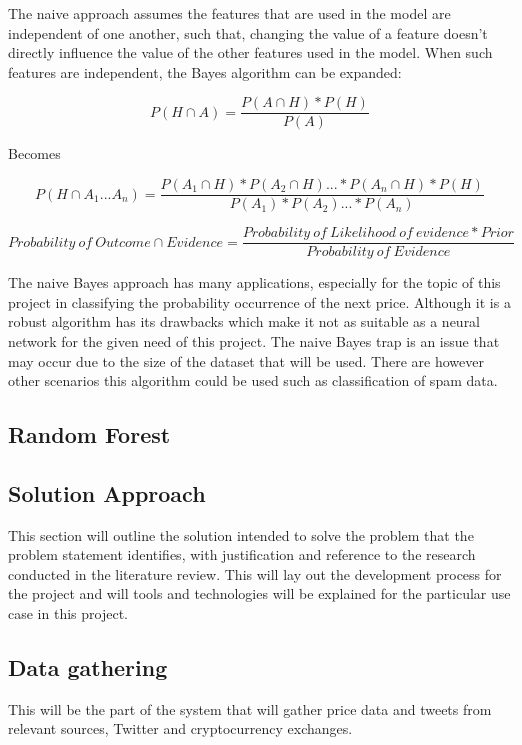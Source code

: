 \documentclass[oneside, 12pt]{article}
\begin{document}
			The naive approach assumes the features that are used in the model are independent of one another, such that, changing the value of a feature doesn't directly influence the value of the other features used in the model. When such features are independent, the Bayes algorithm can be expanded:
			
			\[P(H\cap A) = \frac{P(A\cap H) * P(H)}{P(A)} \]
			
			\begin{center}
				Becomes
			\end{center}
			
			\[P(H\cap A_1 ... A_n) = \frac{P(A_1\cap H) * P(A_2\cap H) ... * P(A_n\cap H) * P(H)}{P(A_1) * P(A_2) ... * P(A_n)} \]
			
			\[Probability \ of \ Outcome \cap Evidence = \frac{Probability \ of \ Likelihood \ of \ evidence * Prior}{Probability \ of \ Evidence} \]
			
			The naive Bayes approach has many applications, especially for the topic of this project in classifying the probability occurrence of the next price. Although it is a robust algorithm has its drawbacks which make it not as suitable as a neural network for the given need of this project. The naive Bayes trap is an issue that may occur due to the size of the dataset that will be used. There are however other scenarios this algorithm could be used such as classification of spam data.\cite{32}
			
			\subsection{Random Forest}
		
	\newpage
	
	\begin{center}
		\section{Solution Approach}\label{solution}
	\end{center}
		This section will outline the solution intended to solve the problem that the problem statement identifies, with justification and reference to the research conducted in the literature review. This will lay out the development process for the project and will tools and technologies will be explained for the particular use case in this project.
		\newline
		
		\subsection{Data gathering}
		This will be the part of the system that will gather price data and tweets from relevant sources, Twitter and cryptocurrency exchanges.
		\newline
		
\end{document}
